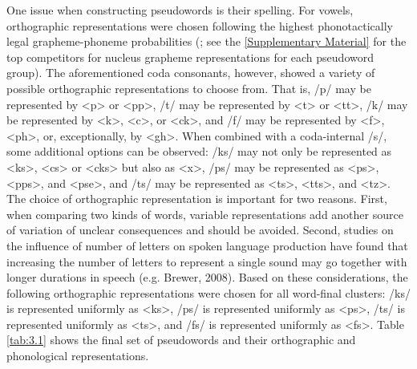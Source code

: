 One issue when constructing pseudowords is their spelling. For vowels, orthographic representations were chosen following the highest phonotactically legal grapheme-phoneme probabilities (\cite{Gontijo2003}; see the \ref{Supplementary Material} for the top competitors for nucleus grapheme representations for each pseudoword group). The aforementioned coda consonants, however, showed a variety of possible orthographic representations to choose from. That is, /p/ may be represented by <p> or <pp>, /t/ may be represented by <t> or <tt>, /k/ may be represented by <k>, <c>, or <ck>, and /f/ may be represented by <f>, <ph>, or, exceptionally, by <gh>. When combined with a coda-internal /s/, some additional options can be observed: /ks/ may not only be represented as <ks>, <cs> or <cks> but also as <x>, /ps/ may be represented as <ps>, <pps>, and <pse>, and /ts/ may be represented as <ts>, <tts>, and <tz>. The choice of orthographic representation is important for two reasons. First, when comparing two kinds of words, variable representations add another source of variation of unclear consequences and should be avoided. Second, studies on the influence of number of letters on spoken language production have found that increasing the number of letters to represent a single sound may go together with longer durations in speech (e.g. Brewer, 2008). Based on these considerations, the following orthographic representations were chosen for all word-final clusters: /ks/ is represented uniformly as <ks>, /ps/ is represented uniformly as <ps>, /ts/ is represented uniformly as <ts>, and /fs/ is represented uniformly as <fs>. Table \ref{tab:3.1} shows the final set of pseudowords and their orthographic and phonological representations.

